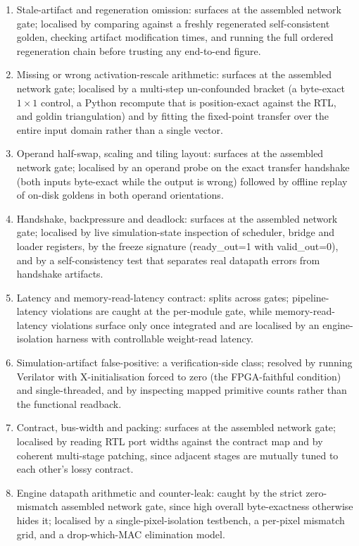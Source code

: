 \begin{enumerate}
\item Stale-artifact and regeneration omission: surfaces at the assembled network gate; localised by comparing against a freshly regenerated self-consistent golden, checking artifact modification times, and running the full ordered regeneration chain before trusting any end-to-end figure.
\item Missing or wrong activation-rescale arithmetic: surfaces at the assembled network gate; localised by a multi-step un-confounded bracket (a byte-exact $1\times1$ control, a Python recompute that is position-exact against the RTL, and goldin triangulation) and by fitting the fixed-point transfer over the entire input domain rather than a single vector.
\item Operand half-swap, scaling and tiling layout: surfaces at the assembled network gate; localised by an operand probe on the exact transfer handshake (both inputs byte-exact while the output is wrong) followed by offline replay of on-disk goldens in both operand orientations.
\item Handshake, backpressure and deadlock: surfaces at the assembled network gate; localised by live simulation-state inspection of scheduler, bridge and loader registers, by the freeze signature (ready\_out=1 with valid\_out=0), and by a self-consistency test that separates real datapath errors from handshake artifacts.
\item Latency and memory-read-latency contract: splits across gates; pipeline-latency violations are caught at the per-module gate, while memory-read-latency violations surface only once integrated and are localised by an engine-isolation harness with controllable weight-read latency.
\item Simulation-artifact false-positive: a verification-side class; resolved by running Verilator with X-initialisation forced to zero (the FPGA-faithful condition) and single-threaded, and by inspecting mapped primitive counts rather than the functional readback.
\item Contract, bus-width and packing: surfaces at the assembled network gate; localised by reading RTL port widths against the contract map and by coherent multi-stage patching, since adjacent stages are mutually tuned to each other's lossy contract.
\item Engine datapath arithmetic and counter-leak: caught by the strict zero-mismatch assembled network gate, since high overall byte-exactness otherwise hides it; localised by a single-pixel-isolation testbench, a per-pixel mismatch grid, and a drop-which-MAC elimination model.

\end{enumerate}
